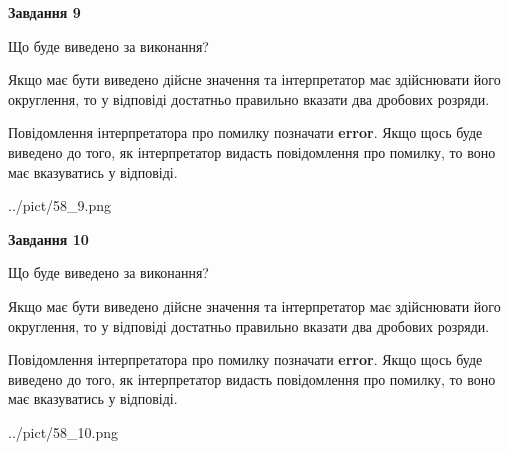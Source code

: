 \documentclass[12pt, ukrainian]{article}
\begin{document}
{\begin {Large}
{\begin {center}\textbf{Завдання 9}\end {center}}\par
Що буде виведено за виконання? \par

Якщо має бути виведено дійсне значення та інтерпретатор має здійснювати його округлення, 
то у відповіді достатньо правильно вказати два дробових розряди.

Повідомлення інтерпретатора про помилку позначати \textbf{error}.
Якщо щось буде виведено до того, як інтерпретатор видасть повідомлення про помилку, 
то воно має вказуватись у відповіді. \par

\begin{center}
	{../pict/58_9.png}
\end{center}
\newpage

{\begin {center}\textbf{Завдання 10}\end {center}}\par
Що буде виведено за виконання? \par

Якщо має бути виведено дійсне значення та інтерпретатор має здійснювати його округлення, 
то у відповіді достатньо правильно вказати два дробових розряди.

Повідомлення інтерпретатора про помилку позначати \textbf{error}.
Якщо щось буде виведено до того, як інтерпретатор видасть повідомлення про помилку, 
то воно має вказуватись у відповіді. \par

\begin{center}
	{../pict/58_10.png}
\end{center}
\newpage

\end {Large}}
\end{document}
